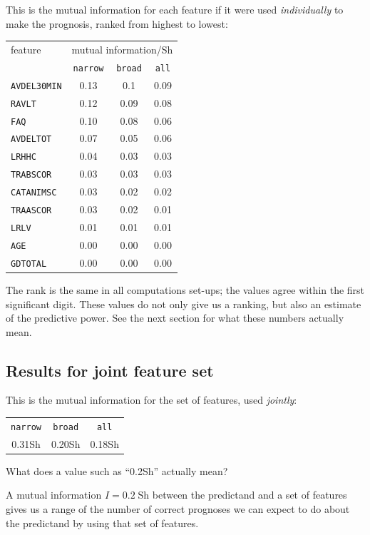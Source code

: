 \documentclass[\ifafour a4paper,12pt,\else a5paper,10pt,\fi%
onecolumn,oneside,article,%
british%
]{memoir}
\theoremstyle{remark}
\theoremstyle{innote}
\renewcommand*{\|}[1][]{\nonscript\:#1\vert\nonscript\:\mathopen{}}
\newcommand*{\bit}{\textrm{Sh}}
\newcommand*{\narrow}{\texttt{narrow}}
\newcommand*{\broad}{\texttt{broad}}
\newcommand*{\all}{\texttt{all}}
\begin{document}
This is the mutual information for each feature if it were used
\emph{individually} to make the prognosis, ranked
from highest to lowest:
\begin{center}
  \begin{tabular}[c]{l|ccc}
    feature &\multicolumn{3}{c}{mutual information/Sh} \\
    & \narrow & \broad & \all \\
\hline
    \texttt{AVDEL30MIN} & 0.13 & 0.1 & 0.09\\
    \texttt{RAVLT} & 0.12 & 0.09 & 0.08\\
    \texttt{FAQ} & 0.10 & 0.08 & 0.06\\
    \texttt{AVDELTOT} & 0.07 & 0.05 & 0.06\\
    \texttt{LRHHC} & 0.04 & 0.03 & 0.03\\
    \texttt{TRABSCOR} & 0.03 & 0.03 & 0.03\\
    \texttt{CATANIMSC} & 0.03 & 0.02 & 0.02\\
    \texttt{TRAASCOR} & 0.03 & 0.02 & 0.01\\
    \texttt{LRLV} & 0.01 & 0.01 & 0.01\\
    \texttt{AGE} & 0.00 & 0.00 & 0.00\\
    \texttt{GDTOTAL} & 0.00 & 0.00 & 0.00
  \end{tabular}                            
\end{center}
The rank is the same in all computations set-ups; the values agree within
the first significant digit. These values do not only give us a ranking,
but also an estimate of the predictive power. See the next section for what these
numbers actually mean.

\subsection{Results for joint feature set}
\label{sec:joint}

This is the mutual information for the set of features, used \emph{jointly}:
\begin{center}
  \begin{tabular}[c]{ccc}
    \narrow & \broad & \all \\
    0.31\;\bit & 0.20\;\bit & 0.18\;\bit
  \end{tabular}
\end{center}

What does a value such as \enquote{0.2\;\bit} actually mean?

A mutual information $I=0.2\;\bit$ between the predictand and a set of
features gives us a range of the number of correct prognoses we can
expect to do about the predictand by using that set of features.
\end{document}
